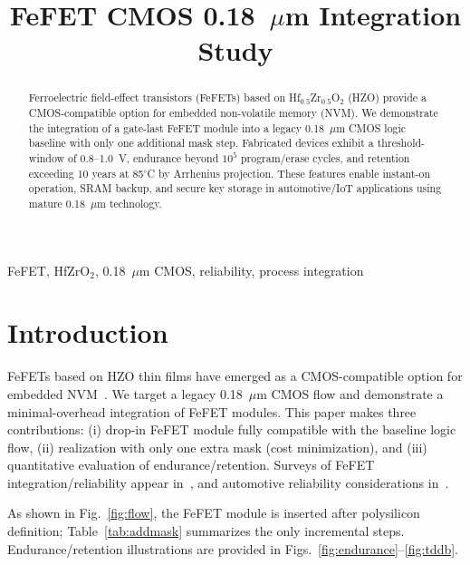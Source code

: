 \documentclass[conference]{IEEEtran}
\begin{document}
\title{FeFET CMOS 0.18~$\mu$m Integration Study}

\author{
}

\maketitle

\begin{abstract}
Ferroelectric field-effect transistors (FeFETs) based on Hf$_{0.5}$Zr$_{0.5}$O$_2$ (HZO) provide a CMOS-compatible option for embedded non-volatile memory (NVM). We demonstrate the integration of a gate-last FeFET module into a legacy 0.18~$\mu$m CMOS logic baseline with only one additional mask step. Fabricated devices exhibit a threshold-window of 0.8--1.0~V, endurance beyond $10^5$ program/erase cycles, and retention exceeding 10 years at 85$^\circ$C by Arrhenius projection. These features enable instant-on operation, SRAM backup, and secure key storage in automotive/IoT applications using mature 0.18~$\mu$m technology.
\end{abstract}

\begin{IEEEkeywords}
FeFET, HfZrO$_2$, 0.18~$\mu$m CMOS, reliability, process integration
\end{IEEEkeywords}

\section{Introduction}
FeFETs based on HZO thin films have emerged as a CMOS-compatible option for embedded NVM~\cite{Boscke2011,Mueller2012,Schenk2019}. We target a legacy 0.18~$\mu$m CMOS flow and demonstrate a minimal-overhead integration of FeFET modules. This paper makes three contributions: (i) drop-in FeFET module fully compatible with the baseline logic flow, (ii) realization with only one extra mask (cost minimization), and (iii) quantitative evaluation of endurance/retention. Surveys of FeFET integration/reliability appear in~\cite{Mueller2015,Park2020}, and automotive reliability considerations in~\cite{Nakamura2003}.

As shown in Fig.~\ref{fig:flow}, the FeFET module is inserted after polysilicon definition; Table~\ref{tab:addmask} summarizes the only incremental steps. Endurance/retention illustrations are provided in Figs.~\ref{fig:endurance}--\ref{fig:tddb}.
\end{document}
